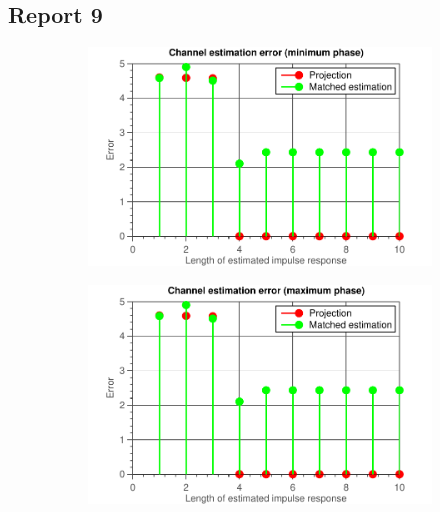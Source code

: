 \documentclass[11pt,titlepage]{report}
\begin{document}
\subsection{Report 9}

\begin{figure}[H]
	\centering
	\begin{subfigure}{0.49\textwidth}
		\includegraphics[width=\textwidth]{../../deliverable-7-resources/figures/ass-1/report-8-9-10/report-9-no-noise/ass-1-report-9-minimum-phase.pdf}
	\end{subfigure}
	\begin{subfigure}{0.49\textwidth}
		\includegraphics[width=\textwidth]{../../deliverable-7-resources/figures/ass-1/report-8-9-10/report-9-no-noise/ass-1-report-9-maximum-phase.pdf}
	\end{subfigure}
	\begin{subfigure}{0.49\textwidth}

\end{subfigure}
\end{figure}
\end{document}
